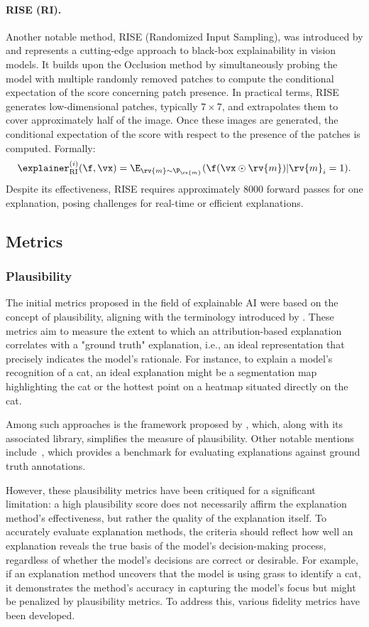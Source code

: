 \paragraph{RISE (RI).} Another notable method, RISE (Randomized Input Sampling), was introduced by \cite{petsiuk2018rise} and represents a cutting-edge approach to black-box explainability in vision models. It builds upon the Occlusion method by simultaneously probing the model with multiple randomly removed patches to compute the conditional expectation of the score concerning patch presence.
In practical terms, RISE generates low-dimensional patches, typically $7 \times 7$, and extrapolates them to cover approximately half of the image. Once these images are generated, the conditional expectation of the score with respect to the presence of the patches is computed. Formally:
$$
 \explainer_{\text{RI}}^{(i)}(\f, \vx) = \E_{\rv{m} \sim \P_{\rv{m}}}(\f(\vx \odot \rv{m}) | \rv{m}_i = 1).
$$
Despite its effectiveness, RISE requires approximately 8000 forward passes for one explanation, posing challenges for real-time or efficient explanations.

\subsection{Metrics}

\subsubsection{Plausibility}
The initial metrics proposed in the field of explainable AI were based on the concept of plausibility, aligning with the terminology introduced by \cite{jacovi2021formalizing}. These metrics aim to measure the extent to which an attribution-based explanation correlates with a "ground truth" explanation, i.e., an ideal representation that precisely indicates the model's rationale. For instance, to explain a model's recognition of a cat, an ideal explanation might be a segmentation map highlighting the cat or the hottest point on a heatmap situated directly on the cat.

Among such approaches is the framework proposed by \cite{fong2017meaningful}, which, along with its associated library, simplifies the measure of plausibility. Other notable mentions include~\cite{poerner2018evaluating,lundberg2017unified}, which provides a benchmark for evaluating explanations against ground truth annotations.

However, these plausibility metrics have been critiqued for a significant limitation: a high plausibility score does not necessarily affirm the explanation method's effectiveness, but rather the quality of the explanation itself. To accurately evaluate explanation methods, the criteria should reflect how well an explanation reveals the true basis of the model's decision-making process, regardless of whether the model's decisions are correct or desirable. For example, if an explanation method uncovers that the model is using grass to identify a cat, it demonstrates the method's accuracy in capturing the model's focus but might be penalized by plausibility metrics. To address this, various fidelity metrics have been developed.

